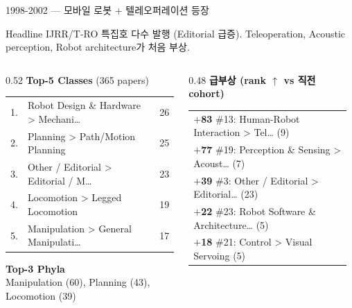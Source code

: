 \documentclass[aspectratio=169,t]{beamer}
\newcommand{\hot}[1]{\textcolor{accentorange}{\textbf{#1}}}
\newcommand{\muted}[1]{\textcolor{mutedgray}{#1}}
\begin{document}
\begin{frame}{1998-2002 \quad — \quad 모바일 로봇 + 텔레오퍼레이션 등장}
\small
\begin{block}{Headline}
IJRR/T-RO 특집호 다수 발행 (Editorial 급증). Teleoperation, Acoustic perception, Robot architecture가 처음 부상.
\end{block}
\vspace{4pt}

\begin{columns}[T,onlytextwidth]
\begin{column}{0.52\textwidth}
\textbf{Top-5 Classes} \muted{\scriptsize (365 papers)}\\[2pt]
\scriptsize
\begin{tabular}{@{}rlr@{}}
    1. & Robot Design \& Hardware > Mechani… & 26 \\
    2. & Planning > Path/Motion Planning & 25 \\
    3. & Other / Editorial > Editorial / M… & 23 \\
    4. & Locomotion > Legged Locomotion & 19 \\
    5. & Manipulation > General Manipulati… & 17 \\
\end{tabular}
\vspace{8pt}

\textbf{\small Top-3 Phyla}\\[2pt]
\scriptsize Manipulation (60), Planning (43), Locomotion (39)
\end{column}

\begin{column}{0.48\textwidth}
\textbf{급부상 (rank $\uparrow$ vs 직전 cohort)}\\[2pt]
\scriptsize
\begin{tabular}{@{}p{0.95\linewidth}@{}}
    \hot{$+$83} \#13: Human-Robot Interaction > Tel… (9) \\
    \hot{$+$77} \#19: Perception \& Sensing > Acoust… (7) \\
    \hot{$+$39} \#3: Other / Editorial > Editorial… (23) \\
    \hot{$+$22} \#23: Robot Software \& Architecture… (5) \\
    \hot{$+$18} \#21: Control > Visual Servoing (5) \\
\end{tabular}
\end{column}
\end{columns}
\end{frame}
\end{document}

